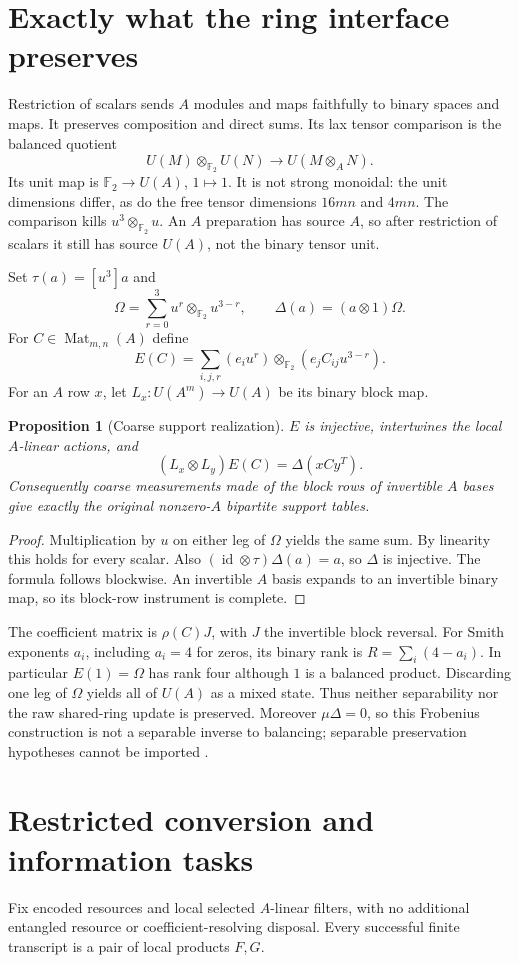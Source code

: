 \documentclass[11pt]{article}
\newtheorem{proposition}[theorem]{Proposition}
\newcommand{\F}{\mathbb F_2}
\begin{document}
\section{Exactly what the ring interface preserves}
Restriction of scalars sends $A$ modules and maps faithfully to binary spaces
and maps. It preserves composition and direct sums. Its lax tensor comparison
is the balanced quotient
\[
 U(M)\otimes_{\F}U(N)\longrightarrow U(M\otimes_A N).
\]
Its unit map is $\F\to U(A)$, $1\mapsto1$. It is not strong monoidal: the unit
dimensions differ, as do the free tensor dimensions $16mn$ and $4mn$. The
comparison kills $u^3\otimes_{\F}u$. An $A$ preparation has source $A$, so after
restriction of scalars it still has source $U(A)$, not the binary tensor unit.

Set $\tau(a)=[u^3]a$ and
\[
 \Omega=\sum_{r=0}^3u^r\otimes_{\F}u^{3-r},\qquad
 \Delta(a)=(a\otimes1)\Omega.
\]
For $C\in\operatorname{Mat}_{m,n}(A)$ define
\[
 E(C)=\sum_{i,j,r}(e_i u^r)\otimes_{\F}(e_j C_{ij}u^{3-r}).
\]
For an $A$ row $x$, let $L_x:U(A^m)\to U(A)$ be its binary block map.

\begin{proposition}[Coarse support realization]
$E$ is injective, intertwines the local $A$-linear actions, and
\[
 (L_x\otimes L_y)E(C)=\Delta(xCy^T).
\]
Consequently coarse measurements made of the block rows of invertible $A$
bases give exactly the original nonzero-$A$ bipartite support tables.
\end{proposition}
\begin{proof}
Multiplication by $u$ on either leg of $\Omega$ yields the same sum. By linearity
this holds for every scalar. Also $(\operatorname{id}\otimes\tau)\Delta(a)=a$,
so $\Delta$ is injective. The formula follows blockwise. An invertible $A$ basis
expands to an invertible binary map, so its block-row instrument is complete.
\end{proof}
The coefficient matrix is $\rho(C)J$, with $J$ the invertible block reversal.
For Smith exponents $a_i$, including $a_i=4$ for zeros, its binary rank is
$R=\sum_i(4-a_i)$. In particular $E(1)=\Omega$ has rank four although $1$ is a
balanced product. Discarding one leg of $\Omega$ yields all of $U(A)$ as a mixed
state. Thus neither separability nor the raw shared-ring update is preserved.
Moreover $\mu\Delta=0$, so this Frobenius construction is not a separable
inverse to balancing; separable preservation hypotheses cannot be imported
\cite{MS10}.

\section{Restricted conversion and information tasks}
Fix encoded resources and local selected $A$-linear filters, with no additional
entangled resource or coefficient-resolving disposal. Every successful finite
transcript is a pair of local products $F,G$.
\end{document}
